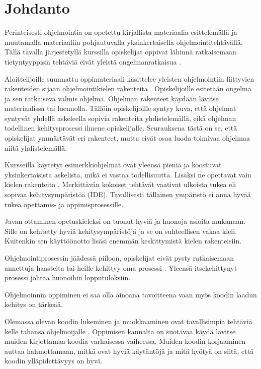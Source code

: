 \section{Johdanto}

Perinteisesti ohjelmointia on opetettu kirjallista materiaalia esittelemällä ja
muutamalla materiaaliin pohjautuvalla yksinkertaisella ohjelmointitehtävällä.
Tällä tavalla järjestetyllä kurssilla opiskelijat oppivat lähinnä ratkaisemaan
tietyntyyppisiä tehtäviä eivät yleistä ongelmanratkaisua
\cite{Gries:1974:WTI:953057.810447}.

Aloittelijoille suunnattu oppimateriaali käsittelee yleisten ohjelmointiin
liittyvien rakenteiden sijaan ohjelmointikielen rakenteita
\cite{Caspersen:2006:NPO:1176617.1176741, Vihavainen:2011:EAM:1953163.1953196}.
Opiskelijoille esitetään ongelma ja sen ratkaiseva valmis ohjelma. Ohjelman
rakenteet käydään lävitse materiaalissa tai luennolla. Tällöin opiskelijoille
syntyy kuva, että ohjelmat syntyvät yhdellä askeleella sopivia rakenteita
yhdistelemällä, eikä ohjelman todellinen kehitysprosessi ilmene opiskelijalle.
Seurauksena tästä on se, että opiskelijat ymmärtävät eri rakenteet, mutta eivät
osaa luoda toimivaa ohjelmaa niitä yhdistelemällä.

Kursseilla käytetyt esimerkkiohjelmat ovat yleensä pieniä ja koostuvat
yksinkertaisista askelista, mikä ei vastaa todellisuutta. Lisäksi ne opettavat
vain kielen rakenteita \cite{Astrachan:1995:ACA:199691.199694}. Merkittävän
kokoiset tehtävät vaativat ulkoista tukea \cite{Kolling:2008} eli sopivaa
kehitysympäristöä (IDE). Tavallisesti tällainen ympäristö ei anna hyvää tukea
opettamis- ja oppimisprosessille. %

Javan ottaminen opetuskieleksi on tuonut hyviä ja huonoja asioita mukanaan.
Sille on kehitetty hyviä kehitysympäristöjä ja se on suhteellisen vakaa kieli.
Kuitenkin sen käyttöönotto lisäsi enemmän keskittymistä kielen rakenteisiin.

Ohjelmointiprosessin jäädessä piiloon, opiskelijat eivät pysty ratkaisemaan
annettuja haasteita tai heille kehittyy oma prosessi
\cite{Caspersen:2006:NPO:1176617.1176741}. Yleensä itsekehittynyt prosessi
johtaa huonoihin lopputuloksiin. %

Ohjelmoinnin oppiminen ei saa olla ainoana tavoitteena vaan myös koodin laadun
kehitys on tärkeää.

Olemassa olevan koodin lukeminen ja muokkaaminen ovat tavallisimpia tehtäviä
kelle tahansa ohjelmoijalle \cite{Kolling:2008}. Oppimisen kannalta on suotavaa
käydä lävitse muiden kirjottamaa koodia varhaisessa vaiheessa. Muiden koodin
korjaaminen auttaa hahmottamaan, mitkä ovat hyviä käytäntöjä ja mitä hyötyä on
siitä, että koodin ylläpidettävyys on hyvä.
